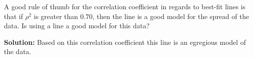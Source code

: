A good rule of thumb for the correlation coefficient in regards to best-fit lines is that if $\rho^2$ is greater than $0.70$, then the line is a good model for the spread of the data. Is using a line a good model for this data?

\nl \textbf{Solution: } Based on this correlation coefficient this line is an egregious model of the data.
